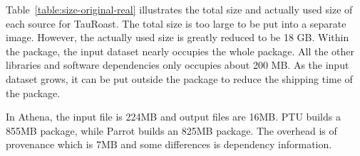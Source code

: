 Table~\ref{table:size-original-real} illustrates the total size and actually used size of each source for TauRoast. 
The total size is too large to be put into a separate image. However, the actually used size is greatly reduced to be 18 GB.
Within the package, the input dataset nearly occupies the whole package. All the other libraries and software dependencies only occupies about 200 MB.
As the input dataset grows, it can be put outside the package to reduce the shipping time of the package.

In Athena, the input file is 224MB and output files are 16MB. PTU builds a 855MB package, while Parrot builds an 825MB package. The overhead is of provenance which is 7MB and 
some differences is dependency information. 
